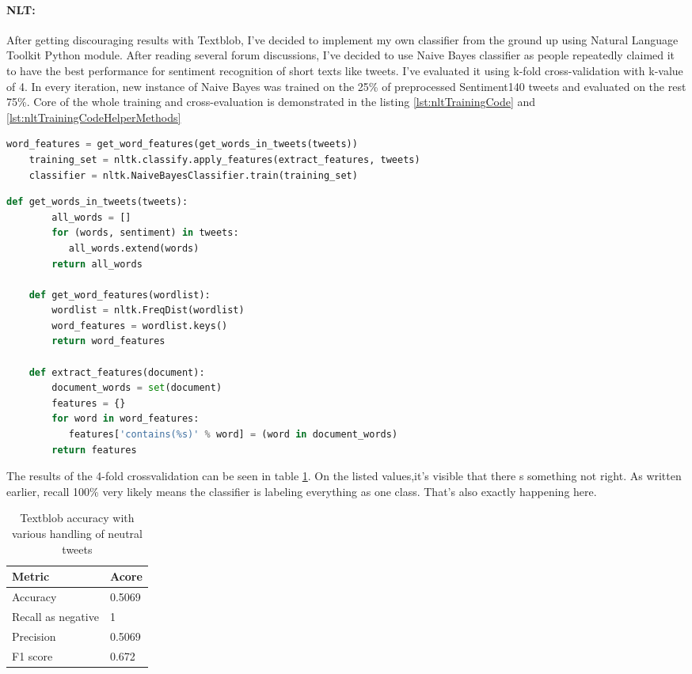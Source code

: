 \paragraph{NLT:} After getting discouraging results with Textblob, I've decided to implement my own classifier from the ground up using Natural Language Toolkit Python module. After reading several forum discussions, I've decided to use Naive Bayes classifier as people repeatedly claimed it to have the best performance for sentiment recognition of short texts like tweets. I've evaluated it using k-fold cross-validation with k-value of 4. In every iteration, new instance of Naive Bayes was trained on the 25\% of preprocessed Sentiment140 tweets and evaluated on the rest 75\%. Core of the whole training and cross-evaluation is demonstrated in the listing \ref{lst:nltTrainingCode} and \ref{lst:nltTrainingCodeHelperMethods}

\begin{lstlisting}[caption={Feature extraction and NLT classifier training},label={lst:nltTrainingCode},language=Python]
    word_features = get_word_features(get_words_in_tweets(tweets))
    training_set = nltk.classify.apply_features(extract_features, tweets)
    classifier = nltk.NaiveBayesClassifier.train(training_set)
\end{lstlisting}    
\begin{lstlisting}[caption={Helper methods for text features extraction},label={lst:nltTrainingCodeHelperMethods},language=Python]
    def get_words_in_tweets(tweets):
    	all_words = []
    	for (words, sentiment) in tweets:
           all_words.extend(words)
    	return all_words    
    
    def get_word_features(wordlist):
    	wordlist = nltk.FreqDist(wordlist)
    	word_features = wordlist.keys()
    	return word_features

    def extract_features(document):
    	document_words = set(document)
    	features = {}
    	for word in word_features:
           features['contains(%s)' % word] = (word in document_words)
    	return features
\end{lstlisting}

The results of the 4-fold crossvalidation can be seen in table \ref{table:NLTmetrics}. On the listed values,it's visible that there
s something not right. As written earlier, recall 100\% very likely means the classifier is labeling everything as one class. That's also exactly happening here.

\begin{table}[H]
\centering
\begin{tabular}{ |p{3cm}|p{3cm}|}
 \hline
\textbf{ Metric }& \textbf{Acore}\\
 \hline
 Accuracy   & 0.5069\\ \hline
 Recall as negative & 1\\ \hline
 Precision & 0.5069\\ \hline 
 F1 score & 0.672\\ \hline 
\end{tabular}
\caption{Textblob accuracy with various handling of neutral tweets}
\label{table:NLTmetrics}
\end{table}

